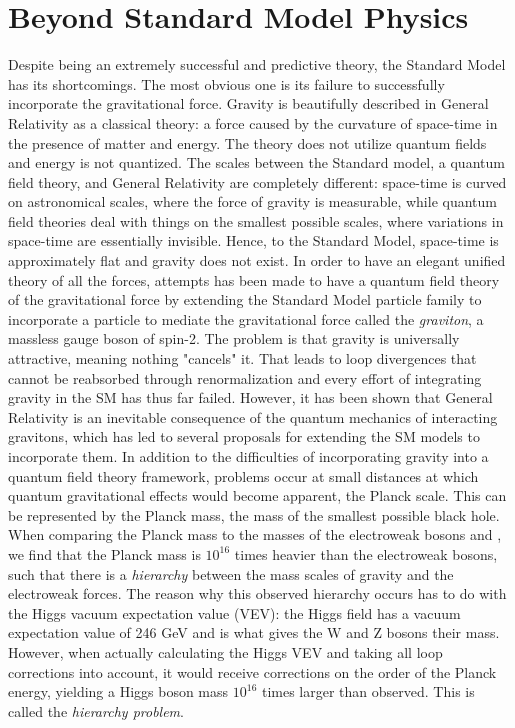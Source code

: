 \clearpage
\section{Beyond Standard Model Physics}
Despite being an extremely successful and predictive theory, the Standard Model has its shortcomings. The most obvious one is its failure to successfully incorporate the gravitational force. Gravity is beautifully described in General Relativity as a classical theory: a force caused by the curvature of space-time in the presence of matter and energy. The theory does not utilize quantum fields and energy is not quantized.
The scales between the Standard model, a quantum field theory, and General Relativity are completely different: space-time is curved on astronomical scales, where the force of gravity is measurable, while quantum field theories deal with things on the smallest possible scales, where variations in space-time are essentially invisible. Hence, to the Standard Model, space-time is approximately flat and gravity does not exist. In order to have an elegant unified theory of all the forces, attempts has been made to have a quantum field theory of the gravitational force by extending the Standard Model particle family to incorporate a particle to mediate the gravitational force called the \emph{graviton}, a massless gauge boson of spin-2. The problem is that gravity is universally attractive, meaning nothing "cancels" it. That leads to loop divergences that cannot be reabsorbed through renormalization and every effort of integrating gravity in the SM has thus far failed. However, it has been shown that General Relativity is an inevitable consequence of the quantum mechanics of interacting gravitons, which has led to several proposals for extending the SM models to incorporate them.\newline
In addition to the difficulties of incorporating gravity into a quantum field theory framework, problems occur at small distances at which quantum gravitational effects would become apparent, the Planck scale. This can be represented by the Planck mass, the mass of the smallest possible black hole. When comparing the Planck mass to the masses of the electroweak bosons \PW and \PZ, we find that the Planck mass is $10^{16}$ times heavier than the electroweak bosons, such that there is a \emph{hierarchy} between the mass scales of gravity and the electroweak forces. The reason why this observed hierarchy occurs has to do with the Higgs vacuum expectation value (VEV): the Higgs field has a vacuum expectation value of 246 GeV and is what gives the W and Z bosons their mass. However, when actually calculating the Higgs VEV and taking all loop corrections into account, it would receive corrections on the order of the Planck energy, yielding a Higgs boson mass $10^{16}$ times larger than observed. This is called the \emph{hierarchy problem}.
